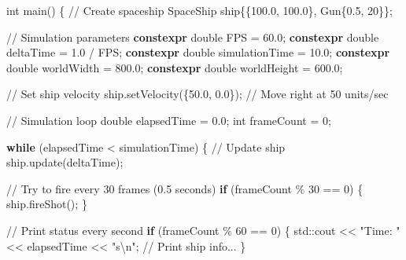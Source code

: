 \documentclass[
]{article}
\newenvironment{Shaded}{\begin{snugshade}}{\end{snugshade}}
\newcommand{\BuiltInTok}[1]{\textcolor[rgb]{0.00,0.23,0.31}{#1}}
\newcommand{\CommentTok}[1]{\textcolor[rgb]{0.37,0.37,0.37}{#1}}
\newcommand{\ControlFlowTok}[1]{\textcolor[rgb]{0.00,0.23,0.31}{\textbf{#1}}}
\newcommand{\DataTypeTok}[1]{\textcolor[rgb]{0.68,0.00,0.00}{#1}}
\newcommand{\DecValTok}[1]{\textcolor[rgb]{0.68,0.00,0.00}{#1}}
\newcommand{\FloatTok}[1]{\textcolor[rgb]{0.68,0.00,0.00}{#1}}
\newcommand{\KeywordTok}[1]{\textcolor[rgb]{0.00,0.23,0.31}{\textbf{#1}}}
\newcommand{\NormalTok}[1]{\textcolor[rgb]{0.00,0.23,0.31}{#1}}
\newcommand{\OperatorTok}[1]{\textcolor[rgb]{0.37,0.37,0.37}{#1}}
\newcommand{\SpecialCharTok}[1]{\textcolor[rgb]{0.37,0.37,0.37}{#1}}
\newcommand{\StringTok}[1]{\textcolor[rgb]{0.13,0.47,0.30}{#1}}
\begin{document}
\begin{Shaded}
\begin{Highlighting}[]
\DataTypeTok{int}\NormalTok{ main}\OperatorTok{()} \OperatorTok{\{}
    \CommentTok{// Create spaceship}
\NormalTok{    SpaceShip ship}\OperatorTok{\{\{}\FloatTok{100.0}\OperatorTok{,} \FloatTok{100.0}\OperatorTok{\},}\NormalTok{ Gun}\OperatorTok{\{}\FloatTok{0.5}\OperatorTok{,} \DecValTok{20}\OperatorTok{\}\};}
    
    \CommentTok{// Simulation parameters}
    \KeywordTok{constexpr} \DataTypeTok{double}\NormalTok{ FPS }\OperatorTok{=} \FloatTok{60.0}\OperatorTok{;}
    \KeywordTok{constexpr} \DataTypeTok{double}\NormalTok{ deltaTime }\OperatorTok{=} \FloatTok{1.0} \OperatorTok{/}\NormalTok{ FPS}\OperatorTok{;}
    \KeywordTok{constexpr} \DataTypeTok{double}\NormalTok{ simulationTime }\OperatorTok{=} \FloatTok{10.0}\OperatorTok{;}
    \KeywordTok{constexpr} \DataTypeTok{double}\NormalTok{ worldWidth }\OperatorTok{=} \FloatTok{800.0}\OperatorTok{;}
    \KeywordTok{constexpr} \DataTypeTok{double}\NormalTok{ worldHeight }\OperatorTok{=} \FloatTok{600.0}\OperatorTok{;}
    
    \CommentTok{// Set ship velocity}
\NormalTok{    ship}\OperatorTok{.}\NormalTok{setVelocity}\OperatorTok{(\{}\FloatTok{50.0}\OperatorTok{,} \FloatTok{0.0}\OperatorTok{\});}  \CommentTok{// Move right at 50 units/sec}
    
    \CommentTok{// Simulation loop}
    \DataTypeTok{double}\NormalTok{ elapsedTime }\OperatorTok{=} \FloatTok{0.0}\OperatorTok{;}
    \DataTypeTok{int}\NormalTok{ frameCount }\OperatorTok{=} \DecValTok{0}\OperatorTok{;}
    
    \ControlFlowTok{while} \OperatorTok{(}\NormalTok{elapsedTime }\OperatorTok{\textless{}}\NormalTok{ simulationTime}\OperatorTok{)} \OperatorTok{\{}
        \CommentTok{// Update ship}
\NormalTok{        ship}\OperatorTok{.}\NormalTok{update}\OperatorTok{(}\NormalTok{deltaTime}\OperatorTok{);}
        
        \CommentTok{// Try to fire every 30 frames (0.5 seconds)}
        \ControlFlowTok{if} \OperatorTok{(}\NormalTok{frameCount }\OperatorTok{\%} \DecValTok{30} \OperatorTok{==} \DecValTok{0}\OperatorTok{)} \OperatorTok{\{}
\NormalTok{            ship}\OperatorTok{.}\NormalTok{fireShot}\OperatorTok{();}
        \OperatorTok{\}}
        
        \CommentTok{// Print status every second}
        \ControlFlowTok{if} \OperatorTok{(}\NormalTok{frameCount }\OperatorTok{\%} \DecValTok{60} \OperatorTok{==} \DecValTok{0}\OperatorTok{)} \OperatorTok{\{}
            \BuiltInTok{std::}\NormalTok{cout }\OperatorTok{\textless{}\textless{}} \StringTok{"Time: "} \OperatorTok{\textless{}\textless{}}\NormalTok{ elapsedTime }\OperatorTok{\textless{}\textless{}} \StringTok{"s}\SpecialCharTok{\textbackslash{}n}\StringTok{"}\OperatorTok{;}
            \CommentTok{// Print ship info...}
        \OperatorTok{\}}
        

\end{Highlighting}
\end{Shaded}
\end{document}
